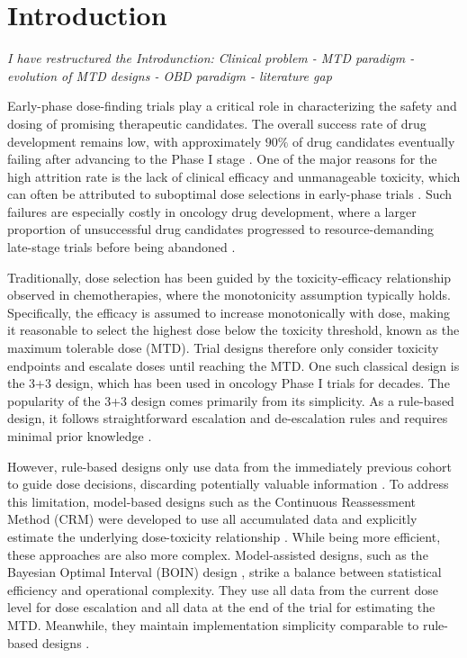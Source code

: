 \documentclass[11pt]{article}
\begin{document}
\section{Introduction}
\medskip
\textit{I have restructured the Introdunction: Clinical problem - MTD paradigm - evolution of MTD designs - OBD paradigm - literature gap}
\medskip

Early-phase dose-finding trials play a critical role in characterizing the safety and dosing of promising therapeutic candidates. The overall success rate of drug development remains low, with approximately $90\%$ of drug candidates eventually failing after advancing to the Phase I stage \parencite{drug_failure}. One of the major reasons for the high attrition rate is the lack of clinical efficacy and unmanageable toxicity, which can often be attributed to suboptimal dose selections in early-phase trials \parencite{drug_failure}. Such failures are especially costly in oncology drug development, where a larger proportion of unsuccessful drug candidates progressed to resource-demanding late-stage trials before being abandoned \parencite{dimasi2007economics}. 

Traditionally, dose selection has been guided by the toxicity-efficacy relationship observed in chemotherapies, where the monotonicity assumption typically holds. Specifically, the efficacy is assumed to increase monotonically with dose, making it reasonable to select the highest dose below the toxicity threshold, known as the maximum tolerable dose (MTD). Trial designs therefore only consider toxicity endpoints and escalate doses until reaching the MTD. One such classical design is the 3+3 design, which has been used in oncology Phase I trials for decades. The popularity of the 3+3 design comes primarily from its simplicity. As a rule-based design, it follows straightforward escalation and de-escalation rules and requires minimal prior knowledge \parencite{rule_based_design}. 

However, rule-based designs only use data from the immediately previous cohort to guide dose decisions, discarding potentially valuable information \parencite{clertant2022early}. To address this limitation, model-based designs such as the Continuous Reassessment Method (CRM) were developed to use all accumulated data and explicitly estimate the underlying dose-toxicity relationship \parencite{CRM,EWOC,review_model_based_design}. While being more efficient, these approaches are also more complex. Model-assisted designs, such as the Bayesian Optimal Interval (BOIN) design \parencite{BOIN}, strike a balance between statistical efficiency and operational complexity. They use all data from the current dose level for dose escalation and all data at the end of the trial for estimating the MTD. Meanwhile, they maintain implementation simplicity comparable to rule-based designs \parencite{zhou2018comparative}. 
\end{document}
